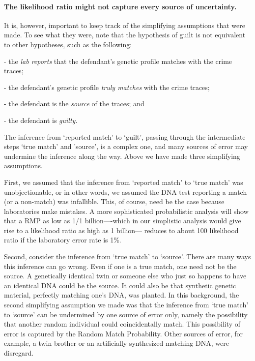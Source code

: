 \documentclass[10pt]{article}
\begin{document}
\paragraph{The likelihood ratio might not capture every source 
of uncertainty.}

It is, however, important to keep track of the simplifying assumptions that were made. 
To see what they were, note that the hypothesis of guilt is not equivalent to 
other hypotheses, such as the following: %

- the \textit{lab reports} that the defendant's 
genetic profile matches with the crime traces;

- the defendant's genetic profile \textit{truly matches} with the crime traces; 

- the defendant is the \textit{source} of the traces; and




- the defendant is \textit{guilty}.

\noindent
The inference from `reported match'  
to `guilt', passing through the intermediate steps `true match' and 'source', is a complex one, 
and many sources of error may undermine the inference along the way.  
Above we have made three simplifying 
assumptions. 

First, we assumed that the inference from `reported match' to `true match' was unobjectionable, or in other words, we assumed
the DNA test reporting a match (or a non-match) was infallible. This, of course, need be the case because laboratories make mistakes.
A more sophisticated probabilistic analysis will show that a RMP as low as 1/1 billion----which in our simplistic analysis would give rise to a likelihood ratio as high as 1 billion---  
reduces to about 100 likelihood ratio if the  laboratory error rate is 1\%.


Second, consider the inference from `true match' to `source'.
There are many ways this inference can go wrong. Even if one is a true match, one need not be the source. A genetically identical twin or someone else 
who just so happens to have an identical DNA could be the source. It could also be that synthetic genetic material, perfectly matching one's DNA, was planted. 
In this background, the second simplifying 
assumption we made was that the inference from `true match' to `source' can be undermined by 
one source of error only, namely the possibility that another random individual 
could coincidentally match. This possibility of error is captured by the 
Random Match Probability. 
Other sources of error, for example, a twin brother or an artificially synthesized matching DNA, were disregard. 
\end{document}
